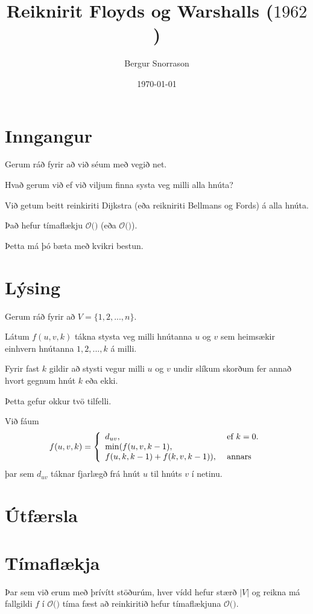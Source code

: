 \title{Reiknirit Floyds og Warshalls ($1962$)}
\author{Bergur Snorrason}
\date{\today}



\frame{\titlepage}

\section{Inngangur}
{
	{
		\item<1-> Gerum ráð fyrir að við séum með vegið net.
		\item<2-> Hvað gerum við ef við viljum finna systa veg milli alla hnúta?
		\item<3-> Við getum beitt reinkiriti Dijkstra (eða reikniriti Bellmans og Fords) á alla hnúta.
		\item<4-> Það hefur tímaflækju $\mathcal{O}($$)$ (eða
					$\mathcal{O}($\onslide<6->{$E \cdot V^2$}$)$).
		\item<7-> Þetta má þó bæta með kvikri bestun.
	}
}

\section{Lýsing}
{
	{
		\item<1-> Gerum ráð fyrir að $V = \{1, 2, ..., n\}$.
		\item<2-> Látum $f(u, v, k)$ tákna stysta veg milli hnútanna $u$ og $v$ sem heimsækir einhvern hnútanna $1, 2, ..., k$ á milli.
		\item<3-> Fyrir fast $k$ gildir að stysti vegur milli $u$ og $v$ undir slíkum skorðum fer annað hvort gegnum hnút $k$ eða ekki.
		\item<4-> Þetta gefur okkur tvö tilfelli.
		\item<5-> Við fáum
		\[
			f(u, v, k) = \left \{
			\env{array}
			{	{l l}
				d_{uv}, & \text{ ef $k = 0$}.\\
				\min(f(u, v, k - 1), &\\
					f(u, k, k - 1) + f(k, v, k - 1)), & \text{ annars}
			}
			\right .
		\]
				þar sem $d_{uv}$ táknar fjarlægð frá hnút $u$ til hnúts $v$ í netinu.
	}
}

\section{Útfærsla}
{
}

\section{Tímaflækja}
{
	{
		\item<1-> Þar sem við erum með þrívítt stöðurúm, hver vídd hefur stærð $|V|$ og reikna má fallgildi $f$ í
					$\mathcal{O}($$)$ tíma fæst að reinkiritið hefur tímaflækjuna $\mathcal{O}($\onslide<3->{$V^3$}$)$.

	}
}

